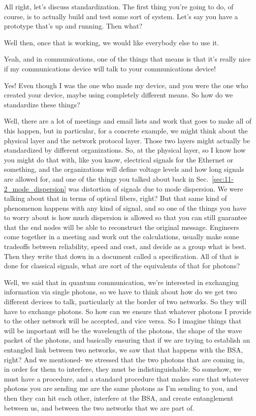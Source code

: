 \rrr All right, let's discuss standardization. The first thing you're going to do, of course, is to actually build and test some sort of system. Let's say you have a prototype that's up and running. Then what?

\mmm Well then, once that is working, we would like everybody else to use it.

\rrr Yeah, and in communications, one of the things that means is that it's really nice if my communications device will talk to your communications device!

\mmm Yes! Even though I was the one who made my device, and you were the one who created your device, maybe using completely different means. So how do we standardize these things?

\rrr Well, there are a lot of meetings and email lists and work that goes to make all of this happen, but in particular, for a concrete example, we might think about the physical layer and the network protocol layer. Those two layers might actually be standardized by different organizations. So, at the physical layer, so I know how you might do that with, like you know, electrical signals for the Ethernet or something, and the organizations will define voltage levels and how long signals are allowed for, and one of the things you talked about back in Sec.~\ref{sec:11-2_mode_dispersion} was distortion of signals due to mode dispersion. We were talking about that in terms of optical fibers, right? But that same kind of phenomenon happens with any kind of signal, and so one of the things you have to worry about is how much dispersion is allowed so that you can still guarantee that the end nodes will be able to reconstruct the original message. Engineers come together in a meeting and work out the calculations, usually make some tradeoffs between reliability, speed and cost, and decide as a group what is best.  Then they write that down in a document called a specification. All of that is done for classical signals, what are sort of the equivalents of that for photons?

\mmm Well, we said that in quantum communication, we're interested in exchanging information via single photons, so we have to think about how do we get two different devices to talk, particularly at the border of two networks. So they will have to exchange photons. So how can we ensure that whatever photons I provide to the other network will be accepted, and vice versa. So I imagine things that will be important will be the wavelength of the photons, the shape of the wave packet of the photons, and basically ensuring that if we are trying to establish an entangled link between two networks, we saw that that happens with the BSA, right? And we mentioned- we stressed that the two photons that are coming in, in order for them to interfere, they must be indistinguishable. So somehow, we must have a procedure, and a standard procedure that makes sure that whatever photons you are sending me are the same photons as I'm sending to you, and then they can hit each other, interfere at the BSA, and create entanglement between us, and between the two networks that we are part of.


